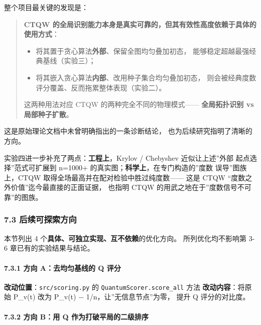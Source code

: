 \documentclass[
  11pt,
]{ctexart}
\providecommand{\tightlist}{%
  \setlength{\itemsep}{0pt}\setlength{\parskip}{0pt}}
\begin{document}
整个项目最关键的发现是：

\begin{quote}
\textbf{CTQW
的全局识别能力本身是真实可靠的，但其有效性高度依赖于具体的使用方式}：

\begin{itemize}
\tightlist
\item
  将其置于贪心算法\textbf{外部}、保留全图均匀叠加初态，
  能够稳定超越最强经典基线（实验三）；
\item
  将其嵌入贪心算法\textbf{内部}、改用种子集合均匀叠加初态，
  则会被经典度数评分覆盖、反而拖累整体表现（实验二）。
\end{itemize}

这两种用法对应 CTQW 的两种完全不同的物理模式------ \textbf{全局拓扑识别
vs 局部种子扩散}。
\end{quote}

这是原始理论文档中未曾明确指出的一条诊断结论，
也为后续研究指明了清晰的方向。

实验四进一步补充了两点：\textbf{工程上}，Krylov / Chebyshev
近似让上述''外部 起点选择''范式可扩展到 n=1000+
的真实图；\textbf{科学上}，在专门构造的''度数 误导''图族上，CTQW
取得全场最高并在配对检验中胜过纯度数------ 这是 CTQW
``度数之外价值''迄今最直接的正面证据， 也指明 CTQW
的用武之地在于''度数信号不可靠''的图族。

\subsubsection{7.3
后续可探索方向}\label{ux540eux7eedux53efux63a2ux7d22ux65b9ux5411}

本节列出 4 个\textbf{具体、可独立实现、互不依赖}的优化方向。
所列优化均不影响第 3-6 章已有的实验结果与结论。

\paragraph{7.3.1 方向 A：去均匀基线的 Q
评分}\label{ux65b9ux5411-aux53bbux5747ux5300ux57faux7ebfux7684-q-ux8bc4ux5206}

\textbf{改动位置}：\texttt{src/scoring.py} 的
\texttt{QuantumScorer.score\_all} 方法 \textbf{改动内容}：将原始 P\_v(t)
改为 P\_v(t) − 1/n，让''无信息节点''为零， 提升 Q 评分的对比度。

\paragraph{7.3.2 方向 B：用 Q
作为打破平局的二级排序}\label{ux65b9ux5411-bux7528-q-ux4f5cux4e3aux6253ux7834ux5e73ux5c40ux7684ux4e8cux7ea7ux6392ux5e8f}
\end{document}
